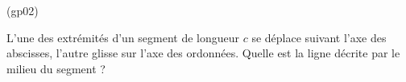 \begin{tiny}(gp02)\end{tiny}
L'une des extrémités d'un segment de longueur $c$ se déplace
suivant l'axe des abscisses, l'autre glisse sur l'axe des
ordonnées. Quelle est la ligne décrite par le milieu du segment ?
